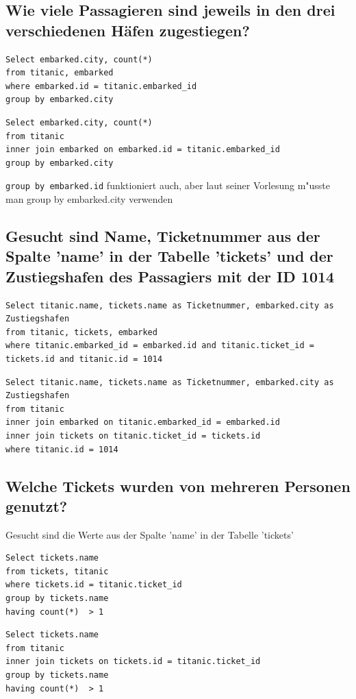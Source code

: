 \documentclass[a4paper, 11pt, titlepage]{article}
\begin{document}
\subsection{Wie viele Passagieren sind jeweils in den drei verschiedenen Häfen zugestiegen?}
\begin{lstlisting}[style = sql]
Select embarked.city, count(*)
from titanic, embarked
where embarked.id = titanic.embarked_id
group by embarked.city
\end{lstlisting}
\begin{lstlisting}[style = sql]
Select embarked.city, count(*)
from titanic 
inner join embarked on embarked.id = titanic.embarked_id
group by embarked.city
\end{lstlisting}
\verb+group by embarked.id+ funktioniert auch, aber laut seiner Vorlesung m"usste man group by embarked.city verwenden
\subsection{Gesucht sind Name, Ticketnummer aus der Spalte 'name' in der Tabelle 'tickets'
und der Zustiegshafen des Passagiers mit der ID 1014}
\begin{lstlisting}[style = sql]
Select titanic.name, tickets.name as Ticketnummer, embarked.city as Zustiegshafen
from titanic, tickets, embarked
where titanic.embarked_id = embarked.id and titanic.ticket_id = tickets.id and titanic.id = 1014
\end{lstlisting}
\begin{lstlisting}[style = sql]
Select titanic.name, tickets.name as Ticketnummer, embarked.city as Zustiegshafen
from titanic
inner join embarked on titanic.embarked_id = embarked.id 
inner join tickets on titanic.ticket_id = tickets.id
where titanic.id = 1014
\end{lstlisting}
\subsection{Welche Tickets wurden von mehreren Personen genutzt?}
Gesucht sind die Werte aus der Spalte 'name' in der Tabelle 'tickets'
\begin{lstlisting}[style = sql]
Select tickets.name
from tickets, titanic
where tickets.id = titanic.ticket_id
group by tickets.name
having count(*)  > 1
\end{lstlisting}
\begin{lstlisting}[style = sql]
Select tickets.name
from titanic
inner join tickets on tickets.id = titanic.ticket_id
group by tickets.name
having count(*)  > 1
\end{lstlisting}
\end{document}
